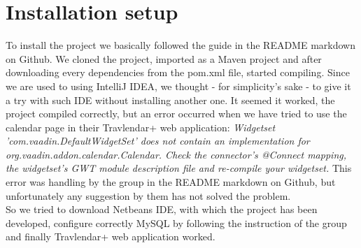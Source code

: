 \chapter{Installation setup}
\label{cha:installation}

To install the project we basically followed the guide in the README markdown on Github. We cloned the project, imported as a Maven project and after downloading every dependencies from the pom.xml file, started compiling. Since we are used to using IntelliJ IDEA, we thought - for simplicity's sake - to give it a try with such IDE without installing another one. It seemed it worked, the project compiled correctly, but an error occurred when we have tried to use the calendar page in their Travlendar+ web application: \textit{Widgetset 'com.vaadin.DefaultWidgetSet' does not contain an implementation for org.vaadin.addon.calendar.Calendar. Check the connector's @Connect mapping, the widgetset's GWT module description file and re-compile your widgetset.} This error was handling by the group in the README markdown on Github, but unfortunately any suggestion by them has not solved the problem.\\
So we tried to download Netbeans IDE, with which the project has been developed, configure correctly MySQL by following the instruction of the group and finally Travlendar+ web application worked.







